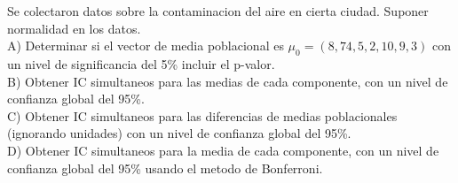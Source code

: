 \documentclass[12pt]{article}
\newenvironment{problem}[2][Problema]{\begin{trivlist}
\item[\hskip \labelsep {\bfseries #1}\hskip \labelsep {\bfseries #2.}]}{\end{trivlist}}
\begin{document}

\begin{problem}{1}
Se colectaron datos sobre la contaminacion del aire en cierta ciudad. Suponer normalidad
en los datos.\\
A) Determinar si el vector de media poblacional es $\mu_0=(8,74,5,2,10,9,3)$ con un nivel
de significancia del 5\% incluir el p-valor. \\  
B) Obtener IC simultaneos para las medias de cada componente, con un nivel de confianza  
global del 95\%. \\  
C) Obtener IC simultaneos para las diferencias de medias poblacionales (ignorando  
unidades) con un nivel de confianza global del 95\%. \\  
D) Obtener IC simultaneos para la media de cada componente, con un nivel de confianza  
global del 95\% usando el metodo de Bonferroni.  
\end{problem}
\end{document}

